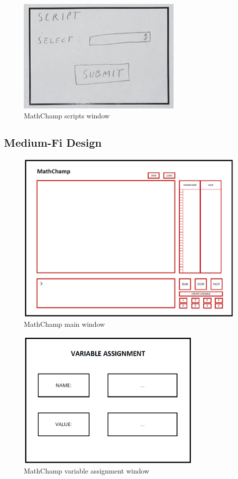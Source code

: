 \documentclass[a4paper, oneside, 11pt]{report}
\begin{document}
\begin{figure}[h]
    \centering
    \includegraphics[width=8cm]{loFiScript.png}
    \caption{MathChamp scripts window}
    \label{fig:Lofi-Scripts}
\end{figure}

\FloatBarrier


\subsection{Medium-Fi Design}
\begin{figure}[h]
    \centering
    \includegraphics[width=14cm]{MediumFiMain.png}
    \caption{MathChamp main window}
    \label{fig:MediumFi-Main}
\end{figure}

\begin{figure}[h]
    \centering
    \includegraphics[width=9cm]{MediumFiVariable.png}
    \caption{MathChamp variable assignment window}
    \label{fig:Mediumfi-VariableAssignment}
\end{figure}
\end{document}
